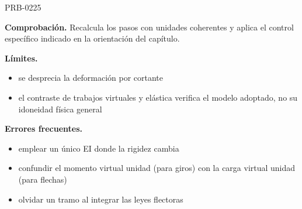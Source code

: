 \begin{studiumworked}{PRB-0225}
\par\textbf{Comprobación.} Recalcula los pasos con unidades coherentes y aplica el control específico indicado en la orientación del capítulo.

\textbf{Límites.}\begin{itemize}\item se desprecia la deformación por cortante
\item el contraste de trabajos virtuales y elástica verifica el modelo adoptado, no su idoneidad física general\end{itemize}

\textbf{Errores frecuentes.}\begin{itemize}\item emplear un único EI donde la rigidez cambia
\item confundir el momento virtual unidad (para giros) con la carga virtual unidad (para flechas)
\item olvidar un tramo al integrar las leyes flectoras\end{itemize}

\end{studiumworked}

\Needspace{.3\textheight}

